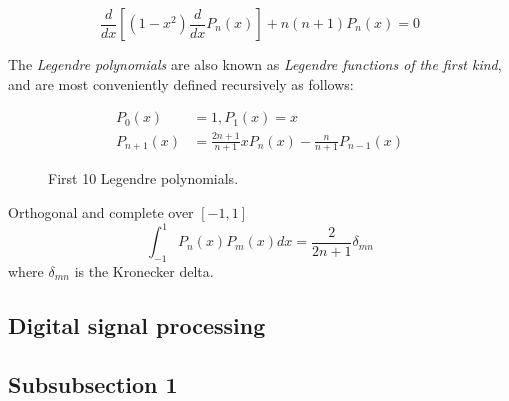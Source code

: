 \documentclass[12pt]{article} %
\begin{document}
\begin{equation} \label{eq:legendre_de}
\frac{d}{dx}\left[(1-x^2)\frac{d}{dx}P_n(x)\right]+n(n+1)P_n(x)=0
\end{equation}

The \emph{Legendre polynomials} are also known as \emph{Legendre functions of the 
first kind}, and are most conveniently defined recursively as follows:

\begin{align*}
P_0(x) &= 1, P_1(x) = x \\
P_{n+1}(x) &= \frac{2n+1}{n+1}xP_n(x) - \frac{n}{n+1}P_{n-1}(x)
\end{align*}

\begin{figure}[H] %
\caption{First 10 Legendre polynomials.}
\label{fig:legendre}
\end{figure}

Orthogonal and complete over $[-1, 1]$
\begin{equation*}
\int_{-1}^{1} P_n(x)P_m(x) dx = \frac{2}{2n+1} \delta_{mn}
\end{equation*}
where $\delta_{mn}$ is the Kronecker delta.

\subsection{Digital signal processing}



\subsection{Subsubsection 1} %

\lipsum[3] %
\end{document}
